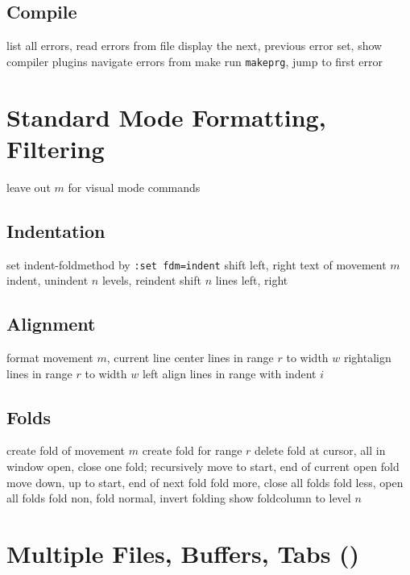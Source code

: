 \subsection{Compile}	{}
	{list all errors, read errors from file}
	{display the next, previous error}
	{set, show compiler plugins}
	{navigate errors from make}
	{run {\tt makeprg}, jump to first error}

\section{Standard Mode Formatting, Filtering}	{leave out $m$ for visual mode commands}
\subsection{Indentation}{set indent-foldmethod by {\tt :set fdm=indent}}
	{shift left, right text of movement $m$}
	{indent, unindent $n$ levels, reindent}
	{shift $n$ lines left, right}

\subsection{Alignment}{}
	{format movement $m$, current line}
	{center lines in range $r$ to width $w$}
	{rightalign lines in range $r$ to width $w$}
	{left align lines in range with indent $i$}

\subsection{Folds}	{}
	{create fold of movement $m$}
	{create fold for range $r$}
	{delete fold at cursor, all in window}
	{open, close one fold; recursively}
	{move to start, end of current open fold}
	{move down, up to start, end of next fold}
	{fold more, close all folds}
	{fold less, open all folds}
	{fold non, fold normal, invert folding}
	{show foldcolumn to level $n$}

\section{Multiple Files, Buffers, Tabs (\enter)}	{}
